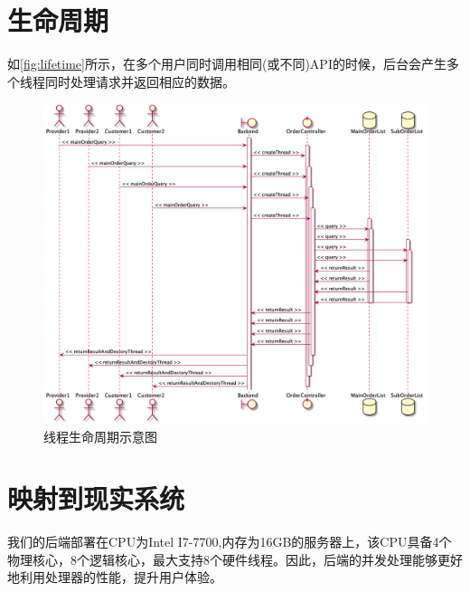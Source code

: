 \section{生命周期}

    如\autoref{fig:lifetime}所示，在多个用户同时调用相同(或不同)API的时候，后台会产生多个线程同时处理请求并返回相应的数据。

    \begin{figure}[htp]
        \centering
        \includegraphics[width=15.5cm]{report/figure/component/lifetime.png}
        \caption{线程生命周期示意图}
        \label{fig:lifetime}
    \end{figure}



\section{映射到现实系统}

我们的后端部署在CPU为Intel I7-7700,内存为16GB的服务器上，该CPU具备4个物理核心，8个逻辑核心，最大支持8个硬件线程。因此，后端的并发处理能够更好地利用处理器的性能，提升用户体验。